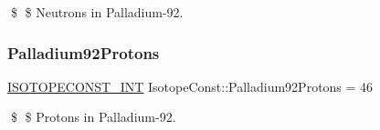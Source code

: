 \$ \$ Neutrons in Palladium-\/92. \mbox{\label{group___isotope_const-_palladium-_pd92_gad325ccdea2c770b90babcd8550d2e7a2}} 
\subsubsection{\texorpdfstring{Palladium92\+Protons}{Palladium92Protons}}
{\footnotesize\ttfamily \mbox{\hyperlink{group___isotope_const-_macros_ga5f18360b3e99483a35c32d789e62621c}{I\+S\+O\+T\+O\+P\+E\+C\+O\+N\+S\+T\+\_\+\+I\+NT}} Isotope\+Const\+::\+Palladium92\+Protons = 46}

\$ \$ Protons in Palladium-\/92. 